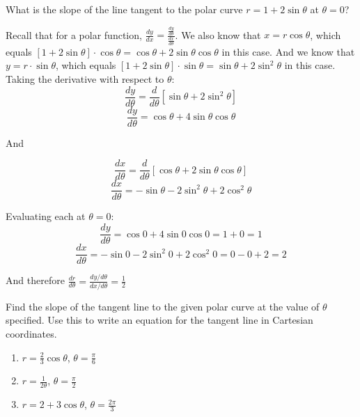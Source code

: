 \begin{Exercise} What is the slope of the line 
tangent to the polar curve $r = 1 + 2\sin{\theta}$ at $\theta = 0$?
\vspace{50mm}
\end{Exercise}

\begin{Answer}[ref = polar1]
Recall that for a polar function, $\frac{dy}{dx} = \frac{\frac{dy}{d\theta}}{
\frac{dx}{d\theta}}$. We also know that $x = r \cos{\theta}$, which equals 
$\left[ 1 + 2\sin{\theta} \right] \cdot \cos{\theta} = \cos{\theta} + 2\sin{
\theta}\cos{\theta}$ in this case. And we know that $y = r \cdot \sin{\theta}$, 
which equals $\left[ 1 + 2 \sin{\theta} \right] \cdot \sin{\theta} = \sin{
\theta} + 2 \sin^2{\theta}$ in this case. Taking the derivative with respect 
to $\theta$:
$$\frac{dy}{d\theta} = \frac{d}{d\theta} \left[ \sin{\theta} + 2 \sin^2{\theta} 
\right]$$
$$\frac{dy}{d\theta} = \cos{\theta} + 4\sin{\theta}\cos{\theta}$$

And

$$\frac{dx}{d\theta} = \frac{d}{d\theta} \left[ \cos{\theta} + 2\sin{\theta}\cos{
\theta} \right]$$
$$\frac{dx}{d\theta} = -\sin{\theta} - 2\sin^2{\theta} + 2\cos^2{\theta}$$

Evaluating each at $\theta = 0$:
$$\frac{dy}{d\theta} = \cos{0} + 4\sin{0}\cos{0} = 1 + 0 = 1$$
$$\frac{dx}{d\theta} = -\sin{0} - 2\sin^2{0} + 2\cos^2{0} = 0 - 0 + 2 = 2$$

And therefore $\frac{dr}{d\theta} = \frac{dy/d\theta}{dx/d\theta} = \frac{1}{2}$
\end{Answer}

\begin{Exercise}[label = polar3]
Find the slope of the tangent line to the given polar curve at the value of 
$\theta$ specified. Use this to write an equation for the tangent line in 
Cartesian coordinates. 
\begin{enumerate}
\item $r = \frac{2}{3}\cos{\theta}$, $\theta = \frac{\pi}{6}$
\item $r = \frac{1}{2\theta}$, $\theta = \frac{\pi}{2}$
\item $r = 2 + 3\cos{\theta}$, $\theta = \frac{2\pi}{3}$
\end{enumerate}
\vspace{120mm}
\end{Exercise}

